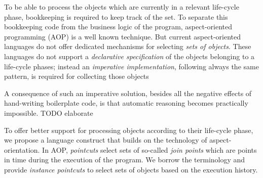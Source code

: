 \documentclass{llncs}
\begin{document}
To be able to process the objects which are currently in a relevant life-cycle phase, bookkeeping is required to keep track of the set. To separate this bookkeeping code from the business logic of the program, aspect-oriented programming (AOP) is a well known technique. But current aspect-oriented languages do not offer dedicated mechanisms for selecting \emph{sets of objects}. These languages do not support a \emph{declarative specification} of the objects belonging to a life-cycle phases; instead an \emph{imperative implementation}, following always the same pattern, is required for collecting those objects 

A consequence of such an imperative solution, besides all the negative effects of hand-writing boilerplate code, is that automatic reasoning becomes practically impossible. TODO elaborate

To offer better support for processing objects according to their life-cycle phase, we propose a language construct that builds on the technology of aspect-orientation. In AOP, \emph{pointcuts} select sets of so-called \emph{join points} which are points in time during the execution of the program. We borrow the terminology and provide \emph{instance pointcuts} to select sets of objects based on the execution history.
\end{document}

